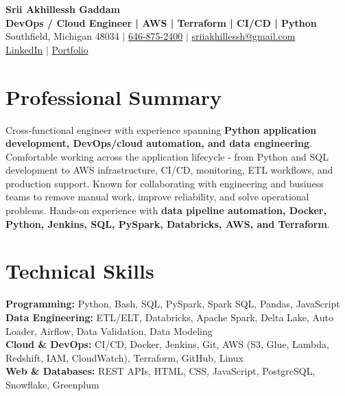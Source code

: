 \documentclass[letterpaper,10pt]{article}
\begin{document}
\fontsize{9.35pt}{10.45pt}\selectfont

\begin{center}
    {\LARGE \textbf{Srii Akhillessh Gaddam}} \\[-1pt]
    \textbf{DevOps / Cloud Engineer | AWS | Terraform | CI/CD | Python} \\[2pt]
    Southfield, Michigan 48034 $|$
    \href{tel:6468752400}{646-875-2400} $|$
    \href{mailto:sriiakhillessh@gmail.com}{sriiakhillessh@gmail.com} \\[1pt]
    \href{https://www.linkedin.com/in/srii-akhiilessh-gaddam-b48668191/}{LinkedIn} $|$
    \href{https://sriiakhillesshg.github.io/portfolio/}{Portfolio}
\end{center}
\vspace{-8pt}

\section{Professional Summary}
\small{Cross-functional engineer with experience spanning \textbf{Python application development, DevOps/cloud automation, and data engineering}. Comfortable working across the application lifecycle - from Python and SQL development to AWS infrastructure, CI/CD, monitoring, ETL workflows, and production support. Known for collaborating with engineering and business teams to remove manual work, improve reliability, and solve operational problems. Hands-on experience with \textbf{data pipeline automation, Docker, Python, Jenkins, SQL, PySpark, Databricks, AWS, and Terraform}.}

\section{Technical Skills}
\small{
\textbf{Programming:} Python, Bash, SQL, PySpark, Spark SQL, Pandas, JavaScript \\
\textbf{Data Engineering:} ETL/ELT, Databricks, Apache Spark, Delta Lake, Auto Loader, Airflow, Data Validation, Data Modeling \\
\textbf{Cloud \& DevOps:} CI/CD, Docker, Jenkins, Git, AWS (S3, Glue, Lambda, Redshift, IAM, CloudWatch), Terraform, GitHub, Linux \\
\textbf{Web \& Databases:} REST APIs, HTML, CSS, JavaScript, PostgreSQL, Snowflake, Greenplum
}
\end{document}
